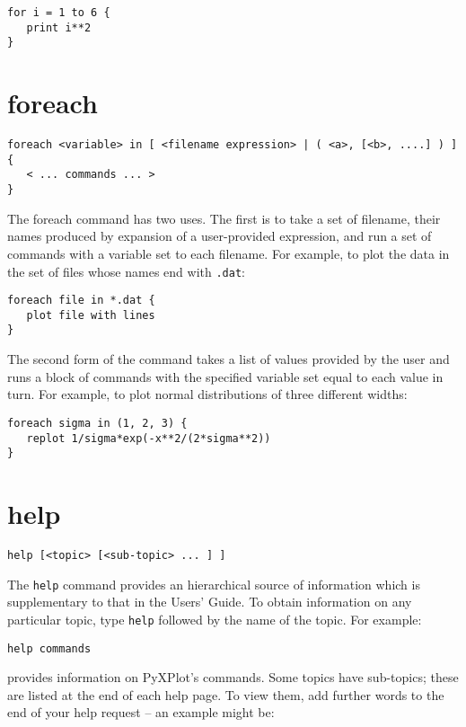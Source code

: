 \begin{verbatim}
for i = 1 to 6 {
   print i**2
}
\end{verbatim}

\section{foreach}

\begin{verbatim}
foreach <variable> in [ <filename expression> | ( <a>, [<b>, ....] ) ] {
   < ... commands ... >
}
\end{verbatim}

The foreach command has two uses.  The first is to take a set of filename, their
names produced by expansion of a user-provided expression, and run a set of
commands with a variable set to each filename.  For example, to plot the data in
the set of files whose names end with {\tt .dat}:

\begin{verbatim}
foreach file in *.dat {
   plot file with lines
}
\end{verbatim}

The second form of the command takes a list of values provided by the user and
runs a block of commands with the specified variable set equal to each value in
turn.  For example, to plot normal distributions of three different widths:

\begin{verbatim}
foreach sigma in (1, 2, 3) {
   replot 1/sigma*exp(-x**2/(2*sigma**2))
}
\end{verbatim}

\section{help}

\begin{verbatim}
help [<topic> [<sub-topic> ... ] ]
\end{verbatim}

The {\tt help} command provides an hierarchical source of information which
is supplementary to that in the Users' Guide.  To obtain information on any
particular topic, type {\tt help} followed by the name of the topic. For
example:

\begin{verbatim}
help commands
\end{verbatim}

\noindent provides information on PyXPlot's commands. Some topics have
sub-topics; these are listed at the end of each help page. To view them, add
further words to the end of your help request -- an example might be:

